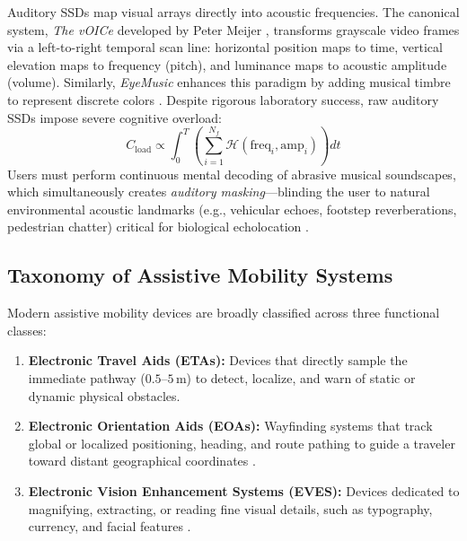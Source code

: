 \documentclass[10pt,twocolumn]{article}
\begin{document}
Auditory SSDs map visual arrays directly into acoustic frequencies. The canonical system, \textit{The vOICe} developed by Peter Meijer \cite{meijer1992augmented}, transforms grayscale video frames via a left-to-right temporal scan line: horizontal position maps to time, vertical elevation maps to frequency (pitch), and luminance maps to acoustic amplitude (volume). Similarly, \textit{EyeMusic} enhances this paradigm by adding musical timbre to represent discrete colors \cite{abboud2014eyemusic}. Despite rigorous laboratory success, raw auditory SSDs impose severe cognitive overload:
\begin{equation}
    C_{\text{load}} \propto \int_{0}^{T} \left( \sum_{i=1}^{N_f} \mathcal{H}(\text{freq}_i, \text{amp}_i) \right) dt
\end{equation}
Users must perform continuous mental decoding of abrasive musical soundscapes, which simultaneously creates \textit{auditory masking}---blinding the user to natural environmental acoustic landmarks (e.g., vehicular echoes, footstep reverberations, pedestrian chatter) critical for biological echolocation \cite{ashmead1998spatial}.

\subsection{Taxonomy of Assistive Mobility Systems}
Modern assistive mobility devices are broadly classified across three functional classes:
\begin{enumerate}[leftmargin=*]
    \item \textbf{Electronic Travel Aids (ETAs):} Devices that directly sample the immediate pathway ($0.5$--$5\,\text{m}$) to detect, localize, and warn of static or dynamic physical obstacles.
    \item \textbf{Electronic Orientation Aids (EOAs):} Wayfinding systems that track global or localized positioning, heading, and route pathing to guide a traveler toward distant geographical coordinates \cite{loomis2001visual}.
    \item \textbf{Electronic Vision Enhancement Systems (EVES):} Devices dedicated to magnifying, extracting, or reading fine visual details, such as typography, currency, and facial features \cite{tapu2020wearable}.
\end{enumerate}
\end{document}
